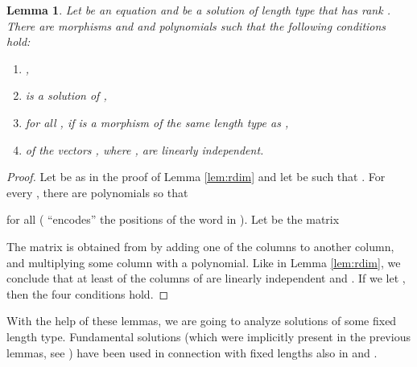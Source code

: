 \documentclass[submission]{eptcs}
\newtheorem{lemma}[theorem]{Lemma}
\theoremstyle{definition}
\begin{document}
\begin{lemma} \label{lem:rdim2}
Let  be an equation and  be a
solution of length type  that has rank . There are morphisms
 and  and polynomials
 such that the following conditions hold:
\begin{enumerate}
\item ,
\item  is a solution of ,
\item  for all
    , if  is a morphism of the same
    length type as ,
\item  of the vectors , where
    , are linearly independent.
\end{enumerate}
\end{lemma}
\begin{proof}
Let  be as in the proof of Lemma \ref{lem:rdim} and let 
be such that . For every , there are
polynomials  so that

for all  ( ``encodes'' the positions
of the word  in ). Let  be the 
matrix

The matrix  is obtained from  by adding one of the
columns to another column, and multiplying some column with a
polynomial. Like in Lemma \ref{lem:rdim}, we conclude that at least
 of the columns of  are linearly independent and . If we let , then the four conditions hold.
\end{proof}

With the help of these lemmas, we are going to analyze solutions of
some fixed length type. Fundamental solutions (which were implicitly
present in the previous lemmas, see \cite{Lo83}) have been used in
connection with fixed lengths also in \cite{Ho01} and \cite{Ho00}.
\end{document}
